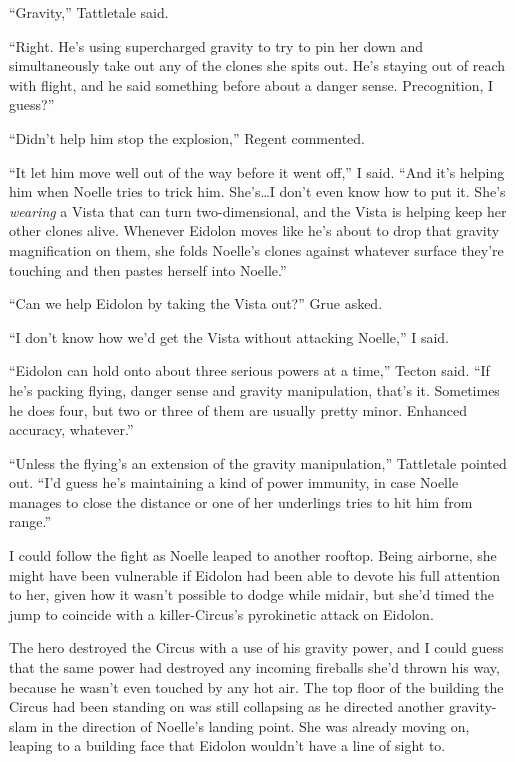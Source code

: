 ``Gravity,'' Tattletale said.



``Right.  He's using supercharged gravity to try to pin her down and simultaneously take out any of the clones she spits out.  He's staying out of reach with flight, and he said something before about a danger sense.  Precognition, I guess?''



``Didn't help him stop the explosion,'' Regent commented.



``It let him move well out of the way before it went off,'' I said.  ``And it's helping him when Noelle tries to trick him.  She's\ldots I don't even know how to put it.  She's \emph{wearing} a Vista that can turn two-dimensional, and the Vista is helping keep her other clones alive.  Whenever Eidolon moves like he's about to drop that gravity magnification on them, she folds Noelle's clones against whatever surface they're touching and then pastes herself into Noelle.''



``Can we help Eidolon by taking the Vista out?'' Grue asked.



``I don't know how we'd get the Vista without attacking Noelle,'' I said.



``Eidolon can hold onto about three serious powers at a time,'' Tecton said.  ``If he's packing flying, danger sense and gravity manipulation, that's it.  Sometimes he does four, but two or three of them are usually pretty minor.  Enhanced accuracy, whatever.''



``Unless the flying's an extension of the gravity manipulation,'' Tattletale pointed out.  ``I'd guess he's maintaining a kind of power immunity, in case Noelle manages to close the distance or one of her underlings tries to hit him from range.''



I could follow the fight as Noelle leaped to another rooftop.  Being airborne, she might have been vulnerable if Eidolon had been able to devote his full attention to her, given how it wasn't possible to dodge while midair, but she'd timed the jump to coincide with a killer-Circus's pyrokinetic attack on Eidolon.



The hero destroyed the Circus with a use of his gravity power, and I could guess that the same power had destroyed any incoming fireballs she'd thrown his way, because he wasn't even touched by any hot air.  The top floor of the building the Circus had been standing on was still collapsing as he directed another gravity-slam in the direction of Noelle's landing point.  She was already moving on, leaping to a building face that Eidolon wouldn't have a line of sight to.



